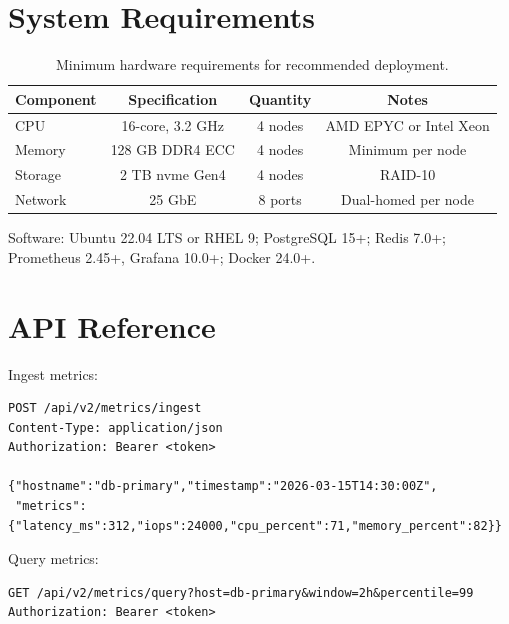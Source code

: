\documentclass[
    language=english,
    doctype=technical-report,
    institution=none,
    titlestyle=book,
    oneside,
    loadGlossaries,
]{../../omnilatex}
\begin{document}
\printglossary[type=abbreviations,title={List of Abbreviations}]
\printglossary[type=main,title={List of Technical Terms}]

\printbibliography

\appendix

\chapter{System Requirements}
\label{app:requirements}

\begin{table}[htbp]
    \centering
    \caption{Minimum hardware requirements for recommended deployment.}
    \label{tab:hardware-reqs}
    \begin{tabular}{@{}lccc@{}}
        \toprule
        Component & Specification & Quantity & Notes \\
        \midrule
        CPU        & 16-core, 3.2 GHz   & 4 nodes & AMD EPYC or Intel Xeon \\
        Memory     & 128 GB DDR4 ECC     & 4 nodes & Minimum per node \\
        Storage    & 2 TB \gls{nvme} Gen4      & 4 nodes & RAID-10 \\
        Network    & 25 GbE              & 8 ports & Dual-homed per node \\
        \bottomrule
    \end{tabular}
\end{table}

Software: Ubuntu 22.04 LTS or RHEL 9; PostgreSQL 15+; Redis 7.0+;
Prometheus 2.45+, Grafana 10.0+; Docker 24.0+.

\chapter{API Reference}
\label{app:api}

Ingest metrics:
\begin{verbatim}
POST /api/v2/metrics/ingest
Content-Type: application/json
Authorization: Bearer <token>

{"hostname":"db-primary","timestamp":"2026-03-15T14:30:00Z",
 "metrics":{"latency_ms":312,"iops":24000,"cpu_percent":71,"memory_percent":82}}
\end{verbatim}

Query metrics:
\begin{verbatim}
GET /api/v2/metrics/query?host=db-primary&window=2h&percentile=99
Authorization: Bearer <token>
\end{verbatim}
\end{document}
